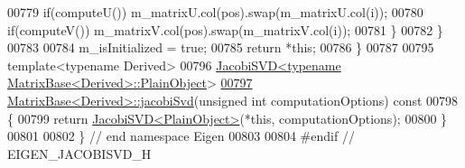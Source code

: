 \begin{DoxyCode}
00779       \textcolor{keywordflow}{if}(computeU()) m\_matrixU.col(pos).swap(m\_matrixU.col(i));
00780       \textcolor{keywordflow}{if}(computeV()) m\_matrixV.col(pos).swap(m\_matrixV.col(i));
00781     \}
00782   \}
00783 
00784   m\_isInitialized = \textcolor{keyword}{true};
00785   \textcolor{keywordflow}{return} *\textcolor{keyword}{this};
00786 \}
00787 
00795 \textcolor{keyword}{template}<\textcolor{keyword}{typename} Derived>
00796 \hyperlink{group___s_v_d___module_class_eigen_1_1_jacobi_s_v_d}{JacobiSVD<typename MatrixBase<Derived>::PlainObject}>
\hyperlink{group___core___module_a5745dca9c54390633b434e54a1d1eedd}{00797} \hyperlink{group___core___module_a5745dca9c54390633b434e54a1d1eedd}{MatrixBase<Derived>::jacobiSvd}(\textcolor{keywordtype}{unsigned} \textcolor{keywordtype}{int} computationOptions)\textcolor{keyword}{ const}
00798 \textcolor{keyword}{}\{
00799   \textcolor{keywordflow}{return} \hyperlink{group___s_v_d___module_class_eigen_1_1_jacobi_s_v_d}{JacobiSVD<PlainObject>}(*\textcolor{keyword}{this}, computationOptions);
00800 \}
00801 
00802 \} \textcolor{comment}{// end namespace Eigen}
00803 
00804 \textcolor{preprocessor}{#endif // EIGEN\_JACOBISVD\_H}
\end{DoxyCode}
